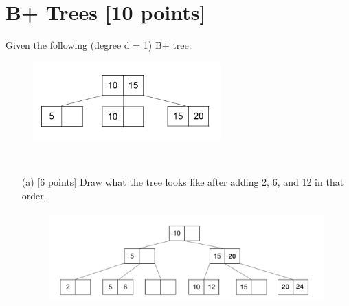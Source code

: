\documentclass[10pt]{article}
\begin{document}
\section{ \textbf{B+ Trees [10 points]}}
Given the following (degree d = 1) B+ tree:
\begin{figure}[h]\centering\includegraphics[height=3cm]{b+tree.png}\end{figure}\\
\begin{enumerate}
    \item[(a)] [6 points] Draw what the tree looks like after adding 2, 6, and 12 in that order.\\ \begin{figure}[h]\centering\includegraphics[height=3.5cm]{b+tree_sol.png}\end{figure}
\end{enumerate}\\
\end{document}
